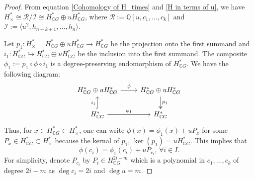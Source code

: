 \documentclass{amsart}
\begin{document}
	\begin{proof}
		From equation \eqref{Cohomology of H_times} and \eqref{H in terms of u}, we have $H^*_{\times}\cong \mathcal R/\mathcal I \cong H^*_{\mathbb{C}G} \oplus u H^*_{\mathbb{C}G}$, where $\mathcal R:=\mathbb Q[u,c_1,\ldots,c_k]$ and $\mathcal I:=\langle u^2, h_{n-k+1},\ldots,h_n\rangle$.
		
		Let $p_1: H^*_{\times} = H^*_{\mathbb{C}G} \oplus u H^*_{\mathbb{C}G} \to H^*_{\mathbb{C}G}$ be the projection onto the first summand and $i_1: H^*_{\mathbb{C}G} \hookrightarrow H^*_{\mathbb{C}G} \oplus u H^*_{\mathbb{C}G}$ be the inclusion into the first summand. The composite $\phi_1:= p_1 \circ \phi \circ i_1$ is a degree-preserving endomorphism of $H^*_{\mathbb{C}G}$. We have the following %
diagram:
		\begin{equation}\label{comm diagram}
			\begin{tikzcd}
				{H^*_{\mathbb CG}\oplus u H^*_{\mathbb CG}} & {H^*_{\mathbb CG} \oplus u H^*_{\mathbb CG}} \\
				{H^*_{\mathbb CG}} & {H^*_{\mathbb CG}}
				\arrow["\phi", from=1-1, to=1-2]
				\arrow["{p_1}", two heads, from=1-2, to=2-2]
				\arrow["{i_1}", hook, from=2-1, to=1-1]
				\arrow["{\phi_1}", from=2-1, to=2-2]
			\end{tikzcd}
		\end{equation}
		Thus, %
for  $x \in H^*_{\mathbb{C}G} \subset H^*_\times$, one can write
		$\phi(x) = \phi_1(x) + u P_x$
		for some $P_x \in H^*_{\mathbb{C}G} \subset H^*_\times$ because the kernal of $p_1$, $\ker(p_1) = u H^*_{\mathbb{C}G}$.
		This implies that \begin{equation}\label{defn of phi}
			\phi(c_i) = \phi_1(c_i) + u P_{c_i},\, \forall i \in I.
		\end{equation} For simplicity, denote $P_{c_i}$ by $P_i\in H^{2i-m}_{\mathbb CG}$ which is a polynomial in $c_1, \dots, c_k$ of degree $2i - m$ as $\deg c_i = 2i$ and $\deg u = m$.
		

\end{proof}
\end{document}
